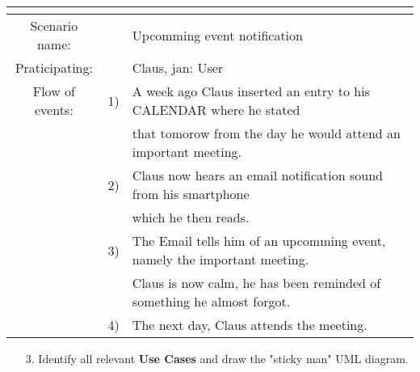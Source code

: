 \documentclass{article}
\begin{document}
\begin{tabular}{c r @{} l}
	\multicolumn{2}{c}{} \\
	\hline
	Scenario name:	&&Upcomming event notification\\
	\hline
	Praticipating:		&&Claus, jan: User \\
	\hline
	Flow of events:	&1)&A week ago Claus inserted an entry to his CALENDAR where he stated\\ 
					&&that tomorow from the day he would attend an important meeting.\\
				&2)&Claus now hears an email notification sound from his smartphone\\ 
					&&which he then reads.\\
				&3)&The Email tells him of an upcomming event, namely the important meeting.\\ 
					&&Claus is now calm, he has been reminded of something he almost forgot.\\
				&4)&The next day, Claus attends the meeting.\\
	\hline
\end{tabular}




	\begin{enumerate}
		\item[3.] Identify all  relevant \textbf{Use Cases} and draw the "sticky man" UML diagram.

	\end{enumerate}
\end{document}
